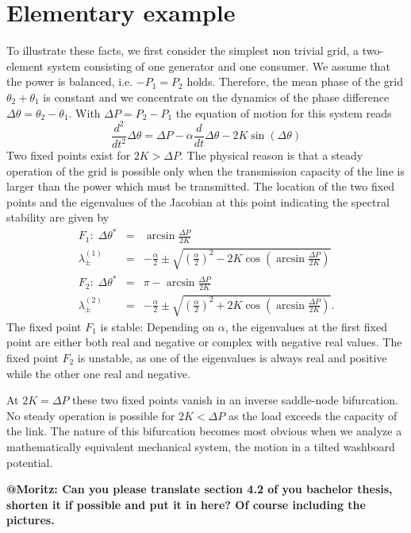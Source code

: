 \documentclass[10pt,aps,pra,twocolumn,superscriptaddress]{revtex4-1}
\newcommand{\be}{\begin{equation}}
\newcommand{\ee}{\end{equation}}
\newcommand{\bea}{\begin{eqnarray}}
\newcommand{\eea}{\end{eqnarray}}
\newcommand{\nn}{\nonumber}
\begin{document}
\section{Elementary example}

To illustrate these facts, we first consider the simplest non trivial grid, a two-element system consisting of one 
generator and one consumer. We assume that the power is balanced, i.e. $-P_1 = P_2$ holds. Therefore, the mean 
phase of the grid  $\theta_2 + \theta_1$ is  constant and we concentrate on the dynamics of the phase difference
$\Delta \theta = \theta_2 - \theta_1$. With $\Delta P=P_2-P_1$ the equation of motion for this system reads
\be
   \frac{d^2}{dt^2} \Delta \theta = \Delta P - \alpha \frac{d}{dt} \Delta \theta  - 2K \sin( \Delta\theta) 
   \label{eqn:eom-2osc}
\ee
Two fixed points exist for $2K > \Delta P$. The physical reason is that a steady operation of the
grid is possible only when the transmission capacity of the line is larger than the power which 
must be transmitted. The location of the two fixed points and the eigenvalues of the Jacobian
at this point indicating the spectral stability are given by
\bea
  F_1: \; \Delta\theta^* &=& \arcsin\frac{\Delta P}{2K}  \\
   \lambda_{\pm}^{(1)} &=& -\frac{\alpha}{2}\pm\sqrt{\left(\frac{\alpha}{2}\right)^2-2K\cos\left(\arcsin\frac{\Delta P}{2K}\right)} \nn \\
  F_2: \; \Delta\theta^* &=& \pi - \arcsin\frac{\Delta P}{2K} \nn \\
    \lambda_{\pm}^{(2)} &=& -\frac{\alpha}{2}\pm\sqrt{\left(\frac{\alpha}{2}\right)^2+2K\cos\left(\arcsin\frac{\Delta P}{2K}\right)}. \nn
\eea
The fixed point $F_1$ is stable: Depending on $\alpha$, the eigenvalues at the first fixed point are either 
both real and negative or complex with negative real values. The fixed point $F_2$ is unstable, as one of 
the eigenvalues is always real and positive while the other one real and negative.

At $2K = \Delta P$ these two fixed points vanish in an inverse saddle-node bifurcation. No steady operation is possible
for $2K < \Delta P$ as the load exceeds the capacity of the link. 
 The nature of this bifurcation becomes most obvious when we analyze a mathematically equivalent
mechanical system, the motion in a tilted washboard potential.

\textbf{@Moritz: Can you please translate section 4.2 of you bachelor thesis, shorten it if possible and put it in here? Of course
including the pictures.}
\end{document}
